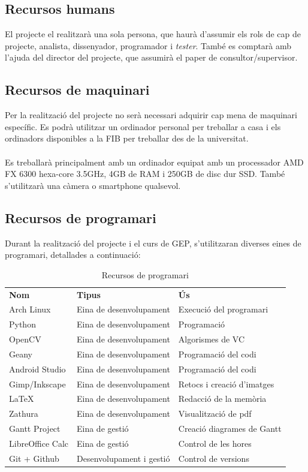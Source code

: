 	\subsection{Recursos humans}
		El projecte el realitzarà una sola persona, que haurà d'assumir els rols de cap de projecte, analista, dissenyador, programador i \textit{tester}.
		També es comptarà amb l'ajuda del director del projecte, que assumirà el paper de consultor/supervisor.
	\subsection{Recursos de maquinari}
		Per la realització del projecte no serà necessari adquirir cap mena de maquinari específic. Es podrà utilitzar un ordinador personal per treballar a casa i els ordinadors disponibles a la FIB per
		treballar des de la universitat.\\\\
		Es treballarà principalment amb un ordinador equipat amb un processador AMD FX 6300 hexa-core 3.5GHz, 4GB de RAM i 250GB de disc dur SSD. També s'utilitzarà una càmera o smartphone qualsevol.
	\subsection{Recursos de programari}
	Durant la realització del projecte i el curs de GEP, s'utilitzaran diverses eines de programari, detallades a continuació:\\
	\begin{table}[H]
		\begin{center}
			\begin{tabular}{l !{\vrule width -1pt}p{5cm} !{\vrule width -1pt}p{5cm}}
			\textbf{Nom} & \textbf{Tipus} & \textbf{Ús} \\
			Arch Linux & Eina de desenvolupament & Execució del programari \\
			Python & Eina de desenvolupament & Programació \\
			OpenCV & Eina de desenvolupament & Algorismes de VC \\
			Geany & Eina de desenvolupament & Programació del codi \\
			Android Studio & Eina de desenvolupament & Programació del codi \\
			Gimp/Inkscape & Eina de desenvolupament & Retocs i creació d'imatges \\
			\LaTeX & Eina de desenvolupament & Redacció de la memòria \\
			Zathura & Eina de desenvolupament & Visualització de pdf \\
			Gantt Project & Eina de gestió & Creació diagrames de Gantt \\
			LibreOffice Calc & Eina de gestió & Control de les hores \\
			Git + Github & Desenvolupament i gestió & Control de versions \\
			\end{tabular}
		\end{center}
		\caption{Recursos de programari}
		\label{table:programari}
	\end{table}
	

